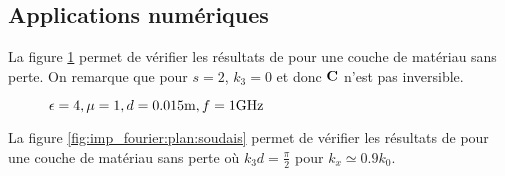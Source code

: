     \subsection{Applications numériques}

        La figure \ref{fig:imp_fourier:plan:hoppe} permet de vérifier les résultats de \cite[p.~33]{hoppe_impedance_1995} pour une couche de matériau sans perte. On remarque que pour \(s=2\), \(k_3 = 0\) et donc \(\mathbf{C}\) n'est pas inversible.

        \begin{figure}[!hbt]
            \centering
            \caption[Reproduction résultat Hoppe & Rahmat-Samii p.~33]{\(\epsilon = 4, \mu = 1, d=0.015\text{m}, f=1\text{GHz}\)}
            \label{fig:imp_fourier:plan:hoppe}
        \end{figure}

        La figure \ref{fig:imp_fourier:plan:soudais} permet de vérifier les résultats de \cite{soudais_3d_2017} pour une couche de matériau sans perte où \(k_3d = \frac{\pi}{2}\) pour \(k_x \simeq 0.9 k_0\).

